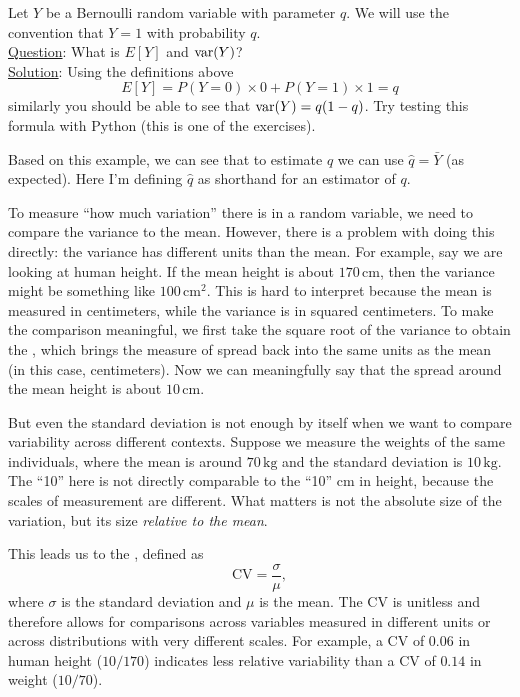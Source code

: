 \begin{example}
Let $Y$ be a Bernoulli random variable with parameter $q$. We will use the convention that $Y=1$ with probability $q$.\\


\noindent
\underline{Question}: What is $E[Y]$ and ${\rm var}(Y)$?\\

\noindent
\underline{Solution}: Using the definitions above
\begin{equation*}
E[Y] = P(Y=0)\times 0 + P(Y=1)\times 1 = q
\end{equation*}
similarly you should be able to see that ${\rm var}(Y) = q(1-q)$. Try testing this formula with Python (this is one of the exercises). 
\end{example}

Based on this example, we can see that to estimate $q$ we can use $\hat{q} = \bar{Y}$ (as expected). Here I'm defining $\hat{q}$ as shorthand for an estimator of $q$. 


To measure ``how much variation'' there is in a random variable, we need to compare the variance to the mean. However, there is a problem with doing this directly: the variance has different units than the mean. For example, say we are looking at human height. If the mean height is about $170 \,\text{cm}$, then the variance might be something like $100 \,\text{cm}^2$. This is hard to interpret because the mean is measured in centimeters, while the variance is in squared centimeters. To make the comparison meaningful, we first take the square root of the variance to obtain the , which brings the measure of spread back into the same units as the mean (in this case, centimeters). Now we can meaningfully say that the spread around the mean height is about $10 \,\text{cm}$.  

But even the standard deviation is not enough by itself when we want to compare variability across different contexts. Suppose we measure the weights of the same individuals, where the mean is around $70 \,\text{kg}$ and the standard deviation is $10 \,\text{kg}$. The ``10'' here is not directly comparable to the ``10'' cm in height, because the scales of measurement are different. What matters is not the absolute size of the variation, but its size \emph{relative to the mean}.  

This leads us to the , defined as 
\begin{equation}
\text{CV} = \frac{\sigma}{\mu},
\end{equation}
where $\sigma$ is the standard deviation and $\mu$ is the mean. The CV is unitless and therefore allows for comparisons across variables measured in different units or across distributions with very different scales. For example, a CV of $0.06$ in human height ($10/170$) indicates less relative variability than a CV of $0.14$ in weight ($10/70$).  

